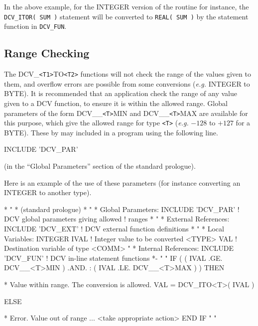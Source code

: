 \documentclass[twoside,11pt,nolof]{starlink}
\begin{document}
In the above example, for the INTEGER version of the routine for
instance, the \texttt{DCV\_ITOR(~SUM~)} statement will be converted to
\texttt{REAL(~SUM~)} by the statement function in \texttt{DCV\_FUN}.

\subsection{Range Checking}

The DCV\_\verb+<T1>+TO\verb+<T2>+ functions will not check the range of the
values given to them, and overflow errors are possible from some conversions
(\emph{e.g.} INTEGER to BYTE).
It is recommended that an application check the range of any value
given to a DCV function, to ensure it is within the allowed range.
Global parameters of the form DCV\_\_\verb+<T>+MIN and DCV\_\_\verb+<T>+MAX
are available for this purpose, which give the allowed range for type
\verb+<T>+ (\emph{e.g.} $-128$ to $+127$ for a BYTE).
These by may included in a program using the following line.

\begin{terminalv}
INCLUDE 'DCV_PAR'
\end{terminalv}

(in the ``Global Parameters'' section of the standard prologue).

Here is an example of the use of these parameters (for instance
converting an INTEGER to another type).

\begin{terminalv}
    *             "
    *     (standard prologue)
    *             "
    *  Global Parameters:
          INCLUDE 'DCV_PAR'          ! DCV global parameters giving allowed
                                     ! ranges
    *             "
    *  External References:
          INCLUDE 'DCV_EXT'          ! DCV external function definitions
    *             "
    *  Local Variables:
          INTEGER IVAL               ! Integer value to be converted
          <TYPE> VAL                 ! Destination variable of type <COMM>
                    "
    *  Internal References:
          INCLUDE 'DCV_FUN'          ! DCV in-line statement functions
    *-
                  "
                  "
          IF ( ( IVAL .GE. DCV__<T>MIN ) .AND.
         :     ( IVAL .LE. DCV__<T>MAX ) ) THEN

    *  Value within range. The conversion is allowed.
             VAL = DCV_ITO<T>( IVAL )

          ELSE

    *  Error. Value out of range ...
             <take appropriate action>
          END IF
                  "
                  "
\end{terminalv}
\end{document}
